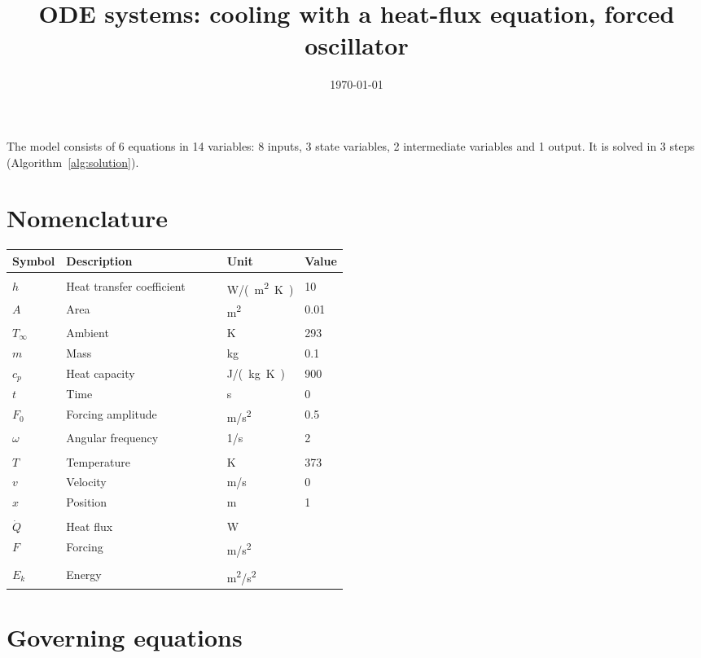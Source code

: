 \documentclass[11pt,a4paper]{article}
\title{ODE systems: cooling with a heat-flux equation, forced oscillator}
\author{}
\date{\today}
\begin{document}
\maketitle

The model consists of 6 equations in 14 variables: 8 inputs, 3 state variables, 2 intermediate variables and 1 output. It is solved in 3 steps (Algorithm~\ref{alg:solution}).

\section{Nomenclature}
\begin{longtable}{@{}l p{0.48\linewidth} l l@{}}
  \toprule
  Symbol & Description & Unit & Value \\
  \midrule
  \endhead
  \bottomrule
  \endfoot
  \multicolumn{4}{@{}l}{\textit{Inputs}} \\
  $h$ & Heat transfer coefficient & \si{W/(m^{2}.K)} & \num{10} \\
  $A$ & Area & \si{m^{2}} & \num{0.01} \\
  $T_\infty$ & Ambient & \si{K} & \num{293} \\
  $m$ & Mass & \si{kg} & \num{0.1} \\
  $c_p$ & Heat capacity & \si{J/(kg.K)} & \num{900} \\
  $t$ & Time & \si{s} & \num{0} \\
  $F_0$ & Forcing amplitude & \si{m/s^{2}} & \num{0.5} \\
  $\omega$ & Angular frequency & \si{1/s} & \num{2} \\
  \addlinespace
  \multicolumn{4}{@{}l}{\textit{State variables}} \\
  $T$ & Temperature & \si{K} & \num{373} \\
  $v$ & Velocity & \si{m/s} & \num{0} \\
  $x$ & Position & \si{m} & \num{1} \\
  \addlinespace
  \multicolumn{4}{@{}l}{\textit{Intermediate variables}} \\
  $\dot{Q}$ & Heat flux & \si{W} &  \\
  $F$ & Forcing & \si{m/s^{2}} &  \\
  \addlinespace
  \multicolumn{4}{@{}l}{\textit{Outputs}} \\
  $E_k$ & Energy & \si{m^{2}/s^{2}} &  \\
\end{longtable}

\section{Governing equations}
\end{document}
